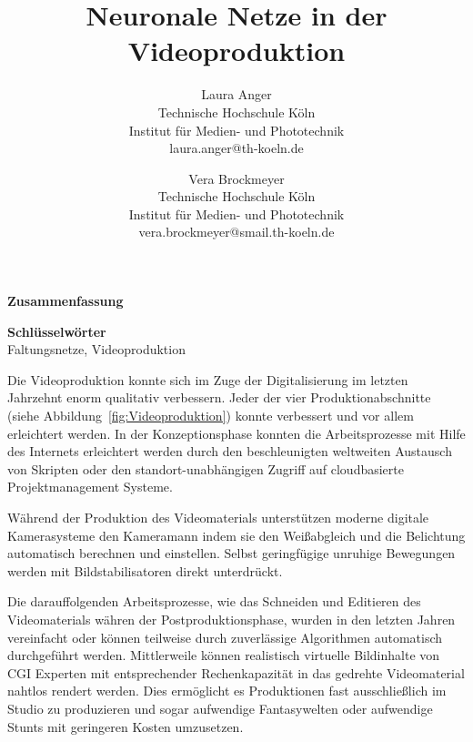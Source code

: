 \documentclass[times, 12pt,twocolumn]{article}
\begin{document}
\title{Neuronale Netze in der Videoproduktion}

\author{Laura Anger\\
Technische Hochschule K\"oln \\ Institut f\"ur Medien- und Phototechnik \\  laura.anger@th-koeln.de \\
\and
Vera Brockmeyer\\
Technische Hochschule K\"oln \\ Institut f\"ur Medien- und Phototechnik \\ vera.brockmeyer@smail.th-koeln.de \\
}

\maketitle
\thispagestyle{empty}


\large{\textbf{Zusammenfassung}}\\ \small %
{} 

\large{\textbf{Schl\"usselw\"orter}}\\ \small %
 Faltungsnetze, Videoproduktion


 \label{sec:Einleitung}
Die Videoproduktion konnte sich im Zuge der Digitalisierung im letzten Jahrzehnt enorm qualitativ verbessern. Jeder der vier Produktionabschnitte (siehe Abbildung~\ref{fig:Videoproduktion}) konnte verbessert und vor allem erleichtert werden. In der Konzeptionsphase konnten die Arbeitsprozesse mit Hilfe des Internets erleichtert werden durch den beschleunigten weltweiten Austausch von Skripten oder den standort-unabhängigen Zugriff auf cloudbasierte Projektmanagement Systeme.

Während der Produktion des Videomaterials unterstützen moderne digitale Kamerasysteme den Kameramann indem sie den Weißabgleich und die Belichtung automatisch berechnen und einstellen. Selbst geringfügige unruhige Bewegungen werden mit Bildstabilisatoren direkt unterdrückt. 

Die darauffolgenden Arbeitsprozesse, wie das Schneiden und Editieren des Videomaterials währen der Postproduktionsphase, wurden in den letzten Jahren vereinfacht oder können teilweise durch zuverlässige Algorithmen automatisch durchgeführt werden. Mittlerweile können realistisch virtuelle Bildinhalte von CGI Experten mit entsprechender Rechenkapazität in das gedrehte Videomaterial nahtlos rendert werden. Dies ermöglicht es Produktionen fast ausschließlich im Studio zu produzieren und sogar aufwendige Fantasywelten oder aufwendige Stunts mit geringeren Kosten umzusetzen.
\end{document}
